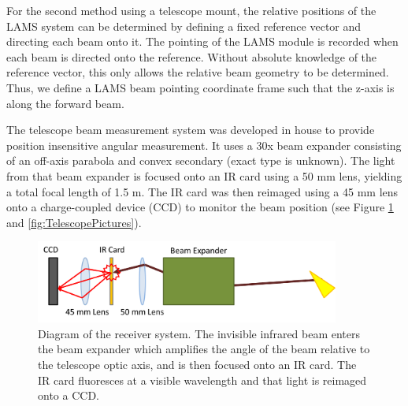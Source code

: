 \documentclass[12pt,twoside,english]{article}\usepackage[]{graphicx}\usepackage[]{color}
\begin{document}



For the second method using a telescope mount, the relative positions of the LAMS system can be determined by defining a fixed reference vector and directing each beam onto it. The pointing of the LAMS module is recorded when each beam is directed onto the reference. Without absolute knowledge of the reference vector, this only allows the relative beam geometry to be determined. Thus, we define a LAMS beam pointing coordinate frame such that the z-axis is along the forward beam. 

The telescope beam measurement system was developed in house to provide position insensitive angular measurement. It uses a 30x beam expander consisting of an off-axis parabola and convex secondary (exact type is unknown). The light from that beam expander is focused onto an IR card using a 50 mm lens, yielding a total focal length of 1.5 m. The IR card was then reimaged using a 45 mm lens onto a charge-coupled device (CCD) to monitor the beam position (see Figure \ref{fig:TelescopePointingRX} and \ref{fig:TelescopePictures}). 

\begin{figure}
\noindent \begin{centering}
\includegraphics[width=10cm]{BeamPointing_ReceiverDiagram}  
\par\end{centering}
\protect\caption[Diagram of the LAMS receiver system]{\label{fig:TelescopePointingRX}Diagram of the receiver system. The invisible infrared beam enters the beam expander which amplifies the angle of the beam relative to the telescope optic axis, and is then focused onto an IR card. The IR card fluoresces at a visible wavelength and that light is reimaged onto a CCD.} 
\end{figure}
\end{document}
